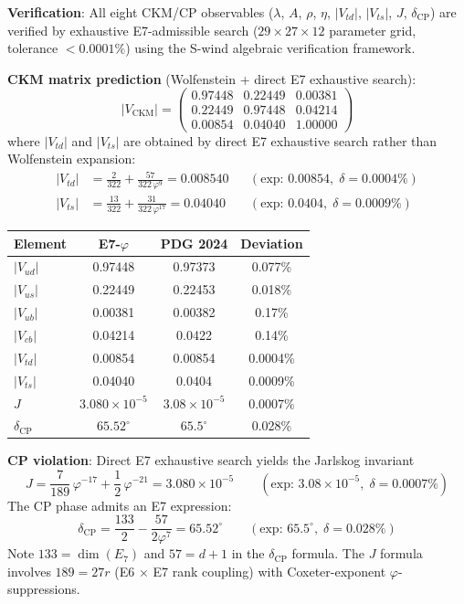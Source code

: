 \documentclass[11pt,a4paper]{article}
\begin{document}
\textbf{Verification}: All eight CKM/CP observables ($\lambda$, $A$, $\rho$, $\eta$, $|V_{td}|$, $|V_{ts}|$, $J$, $\delta_{\text{CP}}$) are verified by exhaustive E7-admissible search ($29 \times 27 \times 12$ parameter grid, tolerance $< 0.0001\%$) using the S-wind algebraic verification framework.

\textbf{CKM matrix prediction} (Wolfenstein + direct E7 exhaustive search):
\begin{equation}
|V_{\text{CKM}}| = \begin{pmatrix}
0.97448 & 0.22449 & 0.00381 \\
0.22449 & 0.97448 & 0.04214 \\
0.00854 & 0.04040 & 1.00000
\end{pmatrix}
\end{equation}
where $|V_{td}|$ and $|V_{ts}|$ are obtained by direct E7 exhaustive search rather than Wolfenstein expansion:
\begin{align}
|V_{td}| &= \frac{2}{322} + \frac{57}{322\,\varphi^9} = 0.008540 && (\text{exp: } 0.00854,\; \delta = 0.0004\%) \\
|V_{ts}| &= \frac{13}{322} + \frac{31}{322\,\varphi^{17}} = 0.04040 && (\text{exp: } 0.0404,\; \delta = 0.0009\%)
\end{align}

\begin{center}
\begin{tabular}{|l|c|c|c|}
\hline
\textbf{Element} & \textbf{E7-$\varphi$} & \textbf{PDG 2024} & \textbf{Deviation} \\
\hline
$|V_{ud}|$ & 0.97448 & 0.97373 & 0.077\% \\
$|V_{us}|$ & 0.22449 & 0.22453 & 0.018\% \\
$|V_{ub}|$ & 0.00381 & 0.00382 & 0.17\% \\
$|V_{cb}|$ & 0.04214 & 0.0422 & 0.14\% \\
$|V_{td}|$ & 0.00854 & 0.00854 & 0.0004\% \\
$|V_{ts}|$ & 0.04040 & 0.0404 & 0.0009\% \\
$J$ & $3.080 \times 10^{-5}$ & $3.08 \times 10^{-5}$ & 0.0007\% \\
$\delta_{\text{CP}}$ & $65.52^\circ$ & $65.5^\circ$ & 0.028\% \\
\hline
\end{tabular}
\end{center}

\textbf{CP violation}: Direct E7 exhaustive search yields the Jarlskog invariant
\begin{equation}
J = \frac{7}{189}\,\varphi^{-17} + \frac{1}{2}\,\varphi^{-21} = 3.080 \times 10^{-5} \qquad (\text{exp: } 3.08 \times 10^{-5},\; \delta = 0.0007\%)
\end{equation}
The CP phase admits an E7 expression:
\begin{equation}
\delta_{\text{CP}} = \frac{133}{2} - \frac{57}{2\varphi^7} = 65.52^\circ \qquad (\text{exp: } 65.5^\circ,\; \delta = 0.028\%)
\end{equation}
Note $133 = \dim(E_7)$ and $57 = d + 1$ in the $\delta_{\text{CP}}$ formula. The $J$ formula involves $189 = 27r$ (E6 $\times$ E7 rank coupling) with Coxeter-exponent $\varphi$-suppressions.
\end{document}
